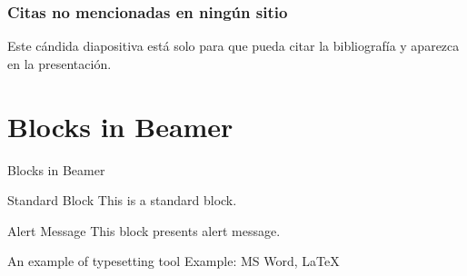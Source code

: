 \documentclass{beamer}
\begin{document}
\begin{frame}
    \frametitle{Citas no mencionadas en ningún sitio}

    Este cándida diapositiva está solo para que pueda citar la 
    bibliografía y aparezca en la presentación. 
    \cite{MostafaLearningFromData}
    \cite{the-elements-of-real-analysis}

\end{frame}



\section{Blocks in Beamer}
\begin{frame}{Blocks in Beamer}
    \begin{block}{Standard Block}
        This is a standard block.
    \end{block}
    \begin{alertblock}{Alert Message}
        This block presents alert message.
    \end{alertblock}
    \begin{exampleblock}{An example of typesetting tool}
        Example: MS Word, \LaTeX{}
    \end{exampleblock}
\end{frame}
\end{document}
